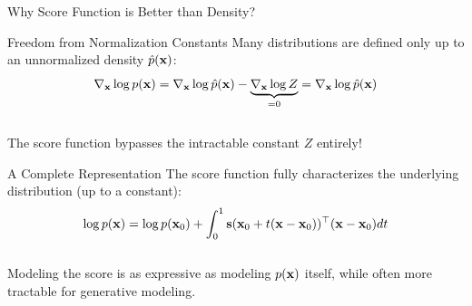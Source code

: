 \documentclass{beamer}
\begin{document}
\begin{frame}{Why Score Function is Better than Density?}
	\begin{block}{Freedom from Normalization Constants}
		Many distributions are defined only up to an unnormalized density $\hat{p}(\mathbf{x})$:
		\vspace{-0.3cm}
		\[
			\nabla_{\mathbf{x}} \log p(\mathbf{x}) = \nabla_{\mathbf{x}} \log \hat{p}(\mathbf{x}) - \underbrace{\nabla_{\mathbf{x}} \log Z}_{=0} = \nabla_{\mathbf{x}} \log \hat{p}(\mathbf{x})
		\]
		\vspace{-0.3cm} \\
		The score function bypasses the intractable constant $Z$ entirely!
	\end{block}
	\eqpause
	\begin{block}{A Complete Representation}
		The score function fully characterizes the underlying distribution (up to a constant):
		\vspace{-0.2cm}
		\[
			\log p(\mathbf{x}) = \log p(\mathbf{x}_0) + \int_0^1 \mathbf{s}(\mathbf{x}_0 + t(\mathbf{x} - \mathbf{x}_0))^\top (\mathbf{x} - \mathbf{x}_0) dt
		\]
		\vspace{-0.5cm} \\
		Modeling the score is as expressive as modeling $p(\mathbf{x})$ itself, while often more tractable for generative modeling.
	\end{block}
\end{frame}
\end{document}
